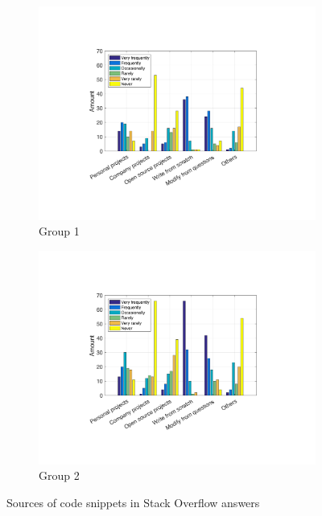 \documentclass{svjour3}                     %
\begin{document}
\begin{figure}
	\begin{subfigure}{.5\textwidth}
		\centering
		\includegraphics[width=.9\linewidth]{survey_snippet_source_1}
		\caption{Group 1}
		\label{fig:survey_snippet_source_1}
	\end{subfigure}%
	\begin{subfigure}{.5\textwidth}
		\centering
		\includegraphics[width=.9\linewidth]{survey_snippet_source_2}
		\caption{Group 2}
		\label{fig:survey_snippet_source_2}
	\end{subfigure}
	\caption{Sources of code snippets in Stack Overflow answers}
	\label{fig:survey_snippet_source}
\end{figure}
\end{document}
